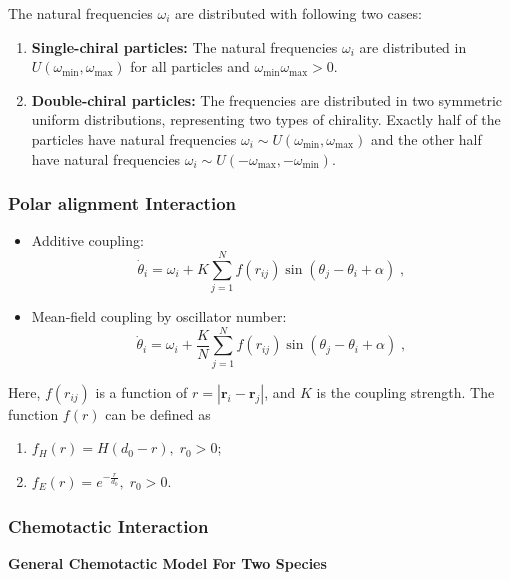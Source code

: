 \documentclass{article}
\begin{document}
The natural frequencies $\omega_i$ are distributed with following two cases:
\begin{enumerate}
    \item \textbf{Single-chiral particles:} The natural frequencies $\omega_i$ are distributed in $U\left( \omega _{\min},\omega _{\max} \right)$ for all particles and $\omega _{\min}\omega _{\max}>0$.
    
    \item \textbf{Double-chiral particles:} The frequencies are distributed in two symmetric uniform distributions, representing two types of chirality. Exactly half of the particles have natural frequencies $\omega_i \sim U\left( \omega _{\min},\omega _{\max} \right)$ and the other half have natural frequencies $\omega_i \sim U\left( -\omega _{\max},-\omega _{\min} \right)$.
\end{enumerate}

\subsubsection{Polar alignment Interaction}
\begin{itemize}
    \item Additive coupling: 
    \begin{equation}
        \label{eq:additionalCouplingDotTheta}
        \dot{\theta}_i=\omega _i+K\sum_{j=1}^{N}f\left( r_{ij} \right)\sin \left( \theta _j-\theta _i+\alpha \right)\;,
    \end{equation}
    \item Mean-field coupling by oscillator number:
    \begin{equation}
        \label{eq:particleDotTheta}
        \dot{\theta}_i=\omega _i+\frac{K}{N}\sum_{j=1}^N{f}\left( r_{ij} \right) \sin \left( \theta _j-\theta _i+\alpha \right) \;,
    \end{equation}
\end{itemize}
Here,  $f\left( r_{ij} \right)$ is a function of $r=\left| \mathbf{r}_i-\mathbf{r}_j \right|$, and $K$ is the coupling strength. 
The function $f\left( r \right)$ can be defined as
\begin{enumerate}
    \item $f_H\left( r \right)=H\left( d_0-r \right),\;r_0>0$;
    \item $f_E\left( r \right)=e^{-\frac{r}{d_0}},\;r_0>0$.
\end{enumerate}

\subsubsection{Chemotactic Interaction}
\noindent\textbf{General Chemotactic Model For Two Species}
\end{document}
